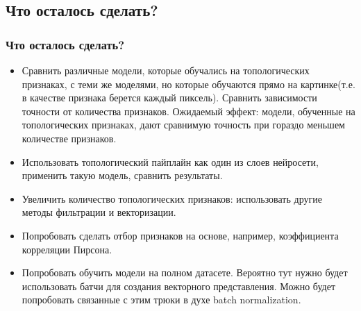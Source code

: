 \documentclass{beamer}
\begin{document}
		\subsection{Что осталось сделать?}
		\begin{frame}
			\frametitle{Что осталось сделать?}
			\begin{itemize}
				\item Сравнить различные модели, которые обучались на топологических признаках, с теми же моделями, но которые обучаются прямо на картинке(т.е. в качестве признака берется каждый пиксель). Сравнить зависимости точности от количества признаков. Ожидаемый эффект: модели, обученные на топологических признаках, дают сравнимую точность при гораздо меньшем количестве признаков.
				\item Использовать топологический пайплайн как один из слоев нейросети, применить такую модель, сравнить результаты.
				\item Увеличить количество топологических признаков: использовать другие методы фильтрации и векторизации.
				\item Попробовать сделать отбор признаков на основе, например, коэффициента корреляции Пирсона. 
				\item Попробовать обучить модели на полном датасете. Вероятно тут нужно будет использовать батчи для создания векторного представления. Можно будет попробовать связанные с этим трюки в духе batch normalization.  
			\end{itemize}
		\end{frame}
	\fi
\end{document}
